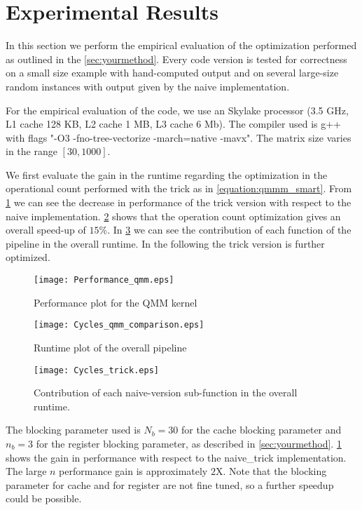 \section{Experimental Results}\label{sec:exp}
\graphicspath{{../../plots/}}

In this section we perform the empirical evaluation of the optimization performed as outlined in the \cref{sec:yourmethod}. Every code version is tested for correctness on a small size example with hand-computed output and on several large-size random instances with output given by the naive implementation.

For the empirical evaluation of the code, we use an Skylake processor (3.5 GHz, L1 cache 128 KB, L2 cache 1 MB, L3 cache 6 Mb). The compiler used is g++ with flags "-O3 -fno-tree-vectorize -march=native -mavx". The matrix size varies in the range $[30,1000]$.

We first evaluate the gain in the runtime regarding the optimization in the operational count performed with the trick as in \cref{equation:qmmm_smart}. From \cref{figure:performance_qmm_kernel} we can see the decrease in performance of the trick version with respect to the naive implementation. \cref{figure:cycles_qmm_comparison} shows that the operation count optimization gives an overall speed-up of $15 \%$. In \cref{figure:Cycles_trick} we can see the contribution of each function of the pipeline in the overall runtime. In the following the trick version is further optimized.

\begin{figure}[h]
\texttt{[image: Performance\_qmm.eps]}
\caption{Performance plot for the QMM kernel}
\label{figure:performance_qmm_kernel}
\end{figure}

\begin{figure}[h]
\texttt{[image: Cycles\_qmm\_comparison.eps]}
\caption{Runtime plot of the overall pipeline}
\label{figure:cycles_qmm_comparison}
\end{figure}

\begin{figure}[h]
\texttt{[image: Cycles\_trick.eps]}
\caption{Contribution of each naive-version sub-function in the overall runtime.} 
\label{figure:Cycles_trick}
\end{figure}


The blocking parameter used is $N_b = 30$ for the cache blocking parameter and $n_b = 3$ for the register blocking parameter, as described in \cref{sec:yourmethod}. \cref{figure:performance_qmm_kernel} shows the gain in performance with respect to the naive\_trick implementation. The large $n$ performance gain is approximately $2$X. Note that the blocking parameter for cache and for register are not fine tuned, so a further speedup could be possible.


